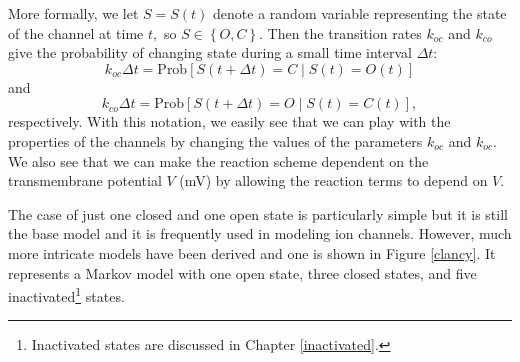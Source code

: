 More formally, we let $S=S(t)$ denote a random variable representing
the state of the channel at time $t,$ so $S\in\left\{  O,C\right\}  $. Then
the transition rates $k_{oc}$ and $k_{co}$ give the probability of changing
state during a small time interval $\Delta t:$
\[
k_{oc}\Delta t=\text{Prob}\left[  S(t+\Delta t)=C\mid S(t)=O(t)\right]
\]
and
\[
k_{co}\Delta t=\text{Prob}\left[  S(t+\Delta t)=O\mid S(t)=C(t)\right],
\]
respectively. With this notation, we easily see that we can play with the properties of the channels by changing the values of the parameters $ k_{oc}$ and  $k_{oc}$. We also see that we can make the reaction scheme dependent on the transmembrane potential $V$  (mV) by allowing the reaction terms to depend on $V.$


The case of just one closed and one open state is particularly simple but it is still the base model and it is frequently used in modeling ion channels.
However, much more intricate models have been derived and one is shown in Figure \ref{clancy}. It represents a Markov model with one open state, three closed states, and five inactivated\footnote{Inactivated states are discussed in Chapter \ref{inactivated}.  } states.

